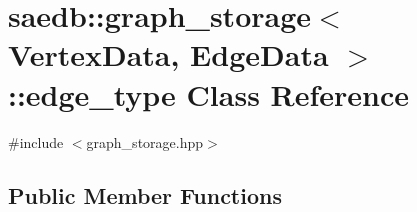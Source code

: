\hypertarget{classsaedb_1_1graph__storage_1_1edge__type}{\section{saedb\-:\-:graph\-\_\-storage$<$ Vertex\-Data, Edge\-Data $>$\-:\-:edge\-\_\-type Class Reference}
\label{df/d01/classsaedb_1_1graph__storage_1_1edge__type}
}


{\ttfamily \#include $<$graph\-\_\-storage.\-hpp$>$}

\subsection*{Public Member Functions}
